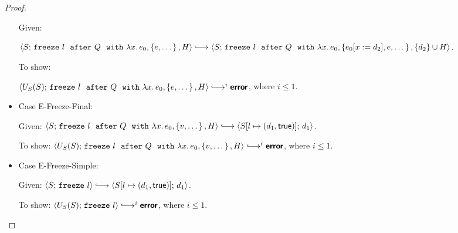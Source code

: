\begin{proof}
\begin{itemize}
    Given:

    $\config{S}{\freezeafterfull{l}{Q}{\lam{x}{e_0}}{\setof{e,
          \dots}}{H}} \parstepsto
    \config{S}{\freezeafterfull{l}{Q}{\lam{x}{e_0}}{\setof{\subst{e_0}{x}{d_2},
          e, \dots}}{\{d_2\}\cup H}}$.

    To show:

    $\config{U_S(S)}{\freezeafterfull{l}{Q}{\lam{x}{e_0}}{\setof{e,
          \dots}}{H}} \parstepsto^i \error$, where $i \leq 1$.


  \item Case {\sc E-Freeze-Final}:

    Given:
    $\config{S}{\freezeafterfull{l}{Q}{\lam{x}{e_0}}{\setof{v,
          \dots}}{H}} \parstepsto
    \config{\extS{S}{l}{d_1}{\frozentrue}}{d_1}$.

    To show:
    $\config{U_S(S)}{\freezeafterfull{l}{Q}{\lam{x}{e_0}}{\setof{v,
          \dots}}{H}} \parstepsto^i \error$, where $i \leq 1$.


  \item Case {\sc E-Freeze-Simple}:

    Given: $\config{S}{\freeze{l}} \parstepsto
    \config{\extS{S}{l}{d_1}{\frozentrue}}{d_1}$.

    To show: $\config{U_S(S)}{\freeze{l}} \parstepsto^i \error$,
    where $i \leq 1$.


  \end{itemize}
\end{proof}
